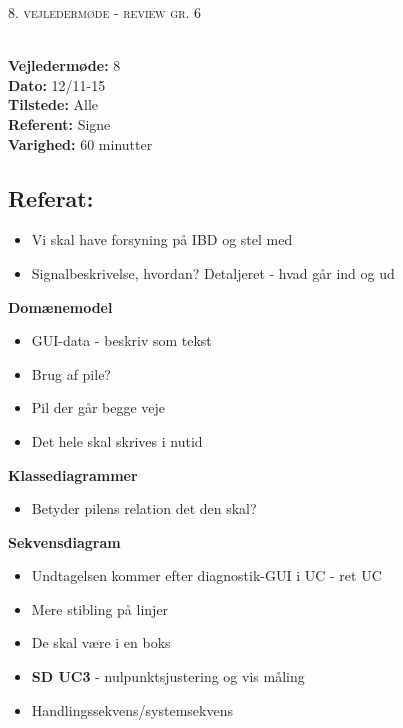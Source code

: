 \documentclass[a4paper,11pt,oneside]{memoir}
\begin{document}
\newpage


\begin{center} 
\huge{\textsc{8. vejledermøde - review gr. 6}}
\end{center}

\textbf{ }
\\
\textbf{Vejledermøde:} 8
\\
\textbf{Dato:} 12/11-15
\\
\textbf{Tilstede:} Alle
\\
\textbf{Referent:} Signe
\\
\textbf{Varighed:} 60 minutter
\\

\subsection{Referat:}
\begin{itemize}
\item Vi skal have forsyning på IBD og stel med 
\item Signalbeskrivelse, hvordan? Detaljeret - hvad går ind og ud
\end{itemize}

\textbf{Domænemodel}
\begin{itemize}
\item GUI-data - beskriv som tekst
\item Brug af pile? 
\item Pil der går begge veje 
\item Det hele skal skrives i nutid
\end{itemize}

\textbf{Klassediagrammer}
\begin{itemize}
\item Betyder pilens relation det den skal? 
\end{itemize}

\textbf{Sekvensdiagram}
\begin{itemize}
\item Undtagelsen kommer efter diagnostik-GUI i UC - ret UC
\item Mere stibling på linjer
\item De skal være i en boks
\item \textbf{SD UC3} - nulpunktsjustering og vis måling
\item Handlingssekvens/systemsekvens 
\end{itemize}
\end{document}
